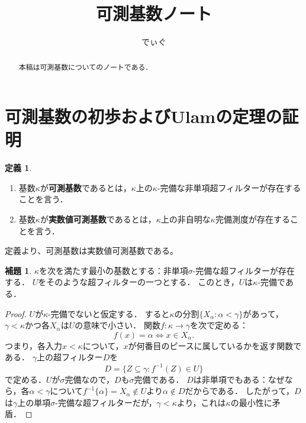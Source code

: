 \documentclass[uplatex]{jsarticle}
\title{\vspace{-2cm} \HUGE 可測基数ノート}
\author{でぃぐ}
\renewcommand\subset{\subseteq}
\theoremstyle{definition}
\newtheorem{defi}[thm]{定義}
\newtheorem{lem}[thm]{補題}
\begin{document}
	
	\maketitle
	
	\begin{abstract}
		本稿は可測基数についてのノートである．
	\end{abstract}
	
	\tableofcontents
	
	
	\section{可測基数の初歩およびUlamの定理の証明}
	
	\begin{defi}
		\begin{enumerate}
			\item 基数$\kappa$が\textbf{可測基数}であるとは，$\kappa$上の$\kappa$-完備な非単項超フィルターが存在することを言う．
			\item 基数$\kappa$が\textbf{実数値可測基数}であるとは，$\kappa$上の非自明な$\kappa$完備測度が存在することを言う．
		\end{enumerate}
	\end{defi}

	定義より、可測基数は実数値可測基数である。

	\begin{lem}
		$\kappa$を次を満たす\.最\.小\.の基数とする：非単項$\sigma$-完備な超フィルターが存在する．
		$U$をそのような超フィルターの一つとする．
		このとき，$U$は$\kappa$-完備である．
	\end{lem}
	\begin{proof}
		$U$が$\kappa$-完備でないと仮定する．
		すると$\kappa$の分割$\{ X_\alpha : \alpha < \gamma \}$があって，$\gamma < \kappa$かつ各$X_\alpha$は$U$の意味で小さい．
		関数$f \colon \kappa \to \gamma$を次で定める：
		\[
			f(x) = \alpha \iff x \in X_\alpha.
		\]
		つまり，各入力$x < \kappa$について，$x$が何番目のピースに属しているかを返す関数である．
		$\gamma$上の超フィルター$D$を
		\[
			D = \{ Z \subset \gamma : f^{-1}(Z) \in U \}
		\]
		で定める．$U$が$\sigma$完備なので，$D$も$\sigma$完備である．
		$D$は非単項でもある：なぜなら，各$\alpha < \gamma$について$f^{-1}\{\alpha\} = X_\alpha \not \in U$より$\alpha \not \in D$だからである．
		したがって，$D$は$\gamma$上の単項$\sigma$-完備な超フィルターだが，$\gamma < \kappa$より，これは$\kappa$の最小性に矛盾．
	\end{proof}
\end{document}
